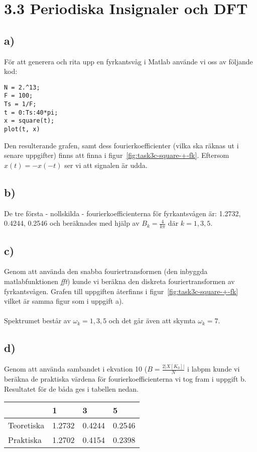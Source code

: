 \section*{3.3 Periodiska Insignaler och DFT}
\subsection*{a)}
För att generera och rita upp en fyrkantsvåg i Matlab använde vi oss av
följande kod:

\begin{lstlisting}
N = 2.^13;
F = 100;
Ts = 1/F;
t = 0:Ts:40*pi;
x = square(t);
plot(t, x)
\end{lstlisting}

Den resulterande grafen, samt dess fourierkoefficienter (vilka ska räknas ut i
senare uppgifter) finns att finna i figur~\ref{fig:task3c-square-+-fk}.
Eftersom $x(t) = -x(-t)$ ser vi att signalen är udda.

\subsection*{b)}
De tre första - nollskilda - fourierkoefficienterna för fyrkantsvågen är: 
1.2732, 0.4244, 0.2546 och beräknades med hjälp av $B_k = \frac{4}{k\pi}$ där
$k=1,3,5$.

\subsection*{c)}
Genom att använda den snabba fouriertransformen (den inbyggda matlabfunktionen
\emph{fft}) kunde vi beräkna den diskreta fouriertransformen av fyrkantsvågen.
Grafen till uppgiften återfinns i figur~\ref{fig:task3c-square-+-fk} vilket är
samma figur som i uppgift a).\\\\
Spektrumet består av $\omega_k = 1, 3, 5$ och det går även att skymta $\omega_k =
7$.

\subsection*{d)}
Genom att använda sambandet i ekvation 10 ($B=\frac{2|X[K_0]|}{N}$ i labpm kunde
vi beräkna de praktiska värdena för fourierkoefficienterna vi tog fram i uppgift
b. Resultatet för de båda ges i tabellen nedan.

\begin{tabular}{| l | l | l | l |}
    \hline
     & 1 & 3 & 5 \\ \hline
    Teoretiska & 1.2732 & 0.4244 & 0.2546 \\ \hline
    Praktiska & 1.2702 & 0.4154 & 0.2398 \\ \hline
\end{tabular}

